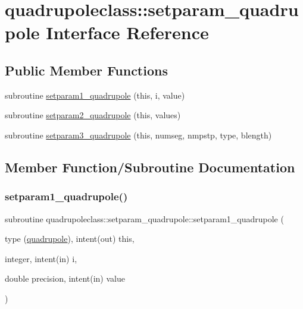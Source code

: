 \hypertarget{interfacequadrupoleclass_1_1setparam__quadrupole}{}\section{quadrupoleclass\+::setparam\+\_\+quadrupole Interface Reference}
\label{interfacequadrupoleclass_1_1setparam__quadrupole}
\subsection*{Public Member Functions}
\begin{DoxyCompactItemize}
\item 
subroutine \mbox{\hyperlink{interfacequadrupoleclass_1_1setparam__quadrupole_af1055fc2252a8acdfdb7416b377bcdbd}{setparam1\+\_\+quadrupole}} (this, i, value)
\item 
subroutine \mbox{\hyperlink{interfacequadrupoleclass_1_1setparam__quadrupole_a0afeab566ad2a8d00552ba6cd402943d}{setparam2\+\_\+quadrupole}} (this, values)
\item 
subroutine \mbox{\hyperlink{interfacequadrupoleclass_1_1setparam__quadrupole_a9efeed4d7a1e905ae01a5efa85c514cf}{setparam3\+\_\+quadrupole}} (this, numseg, nmpstp, type, blength)
\end{DoxyCompactItemize}


\subsection{Member Function/\+Subroutine Documentation}
\mbox{\label{interfacequadrupoleclass_1_1setparam__quadrupole_af1055fc2252a8acdfdb7416b377bcdbd}} 
\subsubsection{\texorpdfstring{setparam1\_quadrupole()}{setparam1\_quadrupole()}}
{\footnotesize\ttfamily subroutine quadrupoleclass\+::setparam\+\_\+quadrupole\+::setparam1\+\_\+quadrupole (\begin{DoxyParamCaption}\item[{type (\mbox{\hyperlink{namespacequadrupoleclass_structquadrupoleclass_1_1quadrupole}{quadrupole}}), intent(out)}]{this,  }\item[{integer, intent(in)}]{i,  }\item[{double precision, intent(in)}]{value }\end{DoxyParamCaption})}

